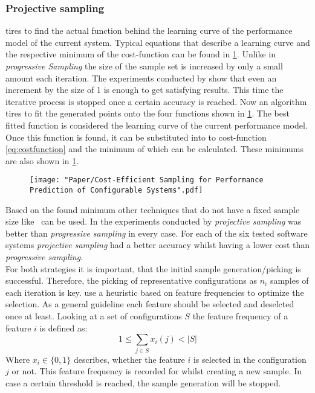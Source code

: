 \subsubsection{Projective sampling} tires to find the actual function behind the learning curve of the performance model of the current system. Typical equations that describe a learning curve and the respective minimum of the cost-function can be found in \cref{tab:learningCurveFunction}.
Unlike in \textit{progressive Sampling} the size of the sample set is increased by only a small amount each iteration. The experiments conducted by \citet{CostEfficientSampling_Gou_Siegmund_2015} show that even an increment by the size of 1 is enough to get satisfying results. This time the iterative process is stopped once a certain accuracy is reached. Now an algorithm tires to fit the generated points onto the four functions shown in \cref{tab:learningCurveFunction}. The best fitted function is considered the learning curve of the current performance model. Once this function is found, it can be substituted into to cost-function \cref{eq:costfunction} and the minimum of which can be calculated. These minimums are also shown in \cref{tab:learningCurveFunction}.
\setlength\intextsep{\baselineskip}
\begin{figure}[h]
	\centering
	\label{tab:learningCurveFunction}
	\texttt{[image: "Paper/Cost-Efficient Sampling for Performance Prediction of Configurable Systems".pdf]}
\end{figure}
\noindent
Based on the found minimum other techniques that do not have a fixed sample size like \VAPP~can be used. In the experiments conducted by \citet{CostEfficientSampling_Gou_Siegmund_2015} \textit{projective sampling} was better than \textit{progressive sampling} in every case. For each of the six tested software systems \textit{projective sampling} had a better accuracy whilst having a lower cost than \textit{progressive sampling}.\\
For both strategies it is important, that the initial sample generation/picking is successful. Therefore, the picking of representative configurations as $n_i$ samples of each iteration is key. 
\citet{CostEfficientSampling_Gou_Siegmund_2015} use a heuristic based on feature frequencies to optimize the selection. As a general guideline each feature should be selected and deselcted once at least. Looking at a set of configurations $S$ the feature frequency of a feature $i$ is defined as:
\begin{equation}
	1 \leq \sum_{j\in S} x_i(j) < |S|
\end{equation}
Where $x_i\in\{0,1\}$ describes, whether the feature $i$ is selected in the configuration $j$ or not. This feature frequency is recorded for whilst creating a new sample. In case a certain threshold is reached, the sample generation will be stopped.


